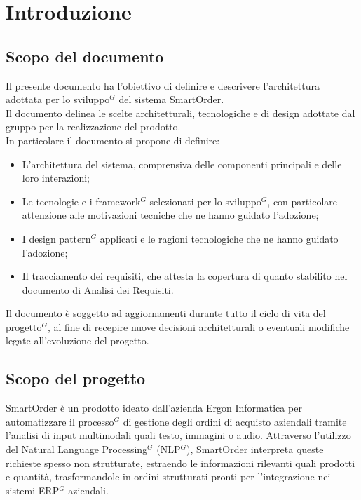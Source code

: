 \section{Introduzione}
\subsection{Scopo del documento}

Il presente documento ha l'obiettivo di definire e descrivere l'architettura adottata per lo sviluppo$^G$ del sistema SmartOrder.\\ 
Il documento delinea le scelte architetturali, tecnologiche e di design adottate dal gruppo per la realizzazione del prodotto.\\
In particolare il documento si propone di definire: 
\begin{itemize}[itemsep=0pt, parsep=1pt, label=$\scriptstyle\bullet$]
    \item L'architettura del sistema, comprensiva delle componenti principali e delle loro interazioni;
    \item Le tecnologie e i framework$^G$ selezionati per lo sviluppo$^G$, con particolare attenzione alle motivazioni tecniche che ne hanno guidato l’adozione;
    \item I design pattern$^G$ applicati e le ragioni tecnologiche che ne hanno guidato l'adozione;
    \item Il tracciamento dei requisiti, che attesta la copertura di quanto stabilito nel documento di Analisi dei Requisiti.
\end{itemize}
Il documento è soggetto ad aggiornamenti durante tutto il ciclo di vita del progetto$^G$, al fine di recepire nuove decisioni architetturali o eventuali modifiche legate all’evoluzione del progetto.

\subsection{Scopo del progetto}
SmartOrder è un prodotto ideato dall'azienda Ergon Informatica per automatizzare il processo$^G$ di gestione degli ordini di acquisto aziendali tramite l'analisi di input multimodali quali testo, immagini o audio. 
Attraverso l'utilizzo del Natural Language Processing$^G$ (NLP$^G$), SmartOrder interpreta queste richieste spesso non strutturate, estraendo le informazioni rilevanti quali prodotti e quantità, trasformandole in ordini strutturati pronti per l'integrazione nei sistemi ERP$^G$ aziendali.

